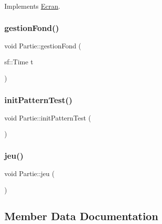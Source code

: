 Implements \mbox{\hyperlink{class_ecran_a016213731438ce2fb37831d8b0eeabed}{Ecran}}.

\mbox{\label{class_partie_af914b2accc0b0c92240af4f01ca7a646}} 
\subsubsection{\texorpdfstring{gestion\+Fond()}{gestionFond()}}
{\footnotesize\ttfamily void Partie\+::gestion\+Fond (\begin{DoxyParamCaption}\item[{sf\+::\+Time}]{t }\end{DoxyParamCaption})}

\mbox{\label{class_partie_a3a0c4920ea230fb971f278a1b22d87a9}} 
\subsubsection{\texorpdfstring{init\+Pattern\+Test()}{initPatternTest()}}
{\footnotesize\ttfamily void Partie\+::init\+Pattern\+Test (\begin{DoxyParamCaption}{ }\end{DoxyParamCaption})}

\mbox{\label{class_partie_a38d54358098b3e5e47d0059a37bff5ea}} 
\subsubsection{\texorpdfstring{jeu()}{jeu()}}
{\footnotesize\ttfamily void Partie\+::jeu (\begin{DoxyParamCaption}{ }\end{DoxyParamCaption})}



\subsection{Member Data Documentation}
\mbox{\label{class_partie_a253b0099bf8ef4c3dce2fe3e3dd8def5}} 
